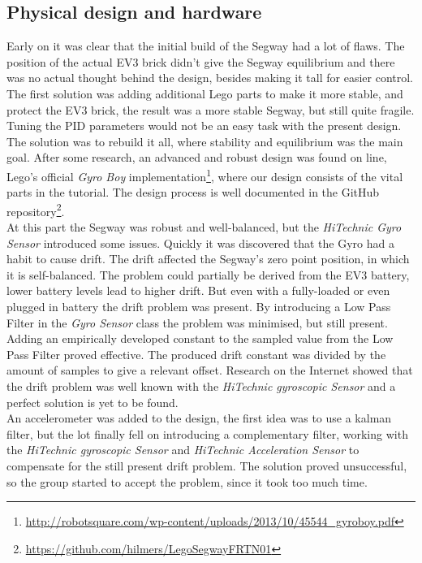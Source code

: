 \subsection{Physical design and hardware}
Early on it was clear that the initial build of the Segway had a lot of flaws. The position of the actual EV3 brick didn't give the Segway equilibrium and there was no actual thought behind the design, besides making it tall for easier control. The first solution was adding additional Lego parts to make it more stable, and protect the EV3 brick, the result was a more stable Segway, but still quite fragile.
Tuning the PID parameters would not be an easy task with the present design. The solution was to rebuild it all, where stability and equilibrium was the main goal. After some research, an advanced and robust design was found on line, Lego's official {\it Gyro Boy} implementation\footnote{\url{http://robotsquare.com/wp-content/uploads/2013/10/45544_gyroboy.pdf}}, where our design consists of the vital parts in the tutorial. The design process is well documented in the GitHub repository\footnote{\url{https://github.com/hilmers/LegoSegwayFRTN01}}. 
\\[3ex]
At this part the Segway was robust and well-balanced, but the {\it HiTechnic Gyro Sensor} introduced some issues. Quickly it was discovered that the Gyro had a habit to cause drift. The drift affected the Segway's zero point position, in which it is self-balanced. The problem could partially be derived from the EV3 battery, lower battery levels lead to higher drift. But even with a fully-loaded or even plugged in battery the drift problem was present. By introducing a Low Pass Filter in the {\it Gyro Sensor} class the problem was minimised, but still present. Adding an empirically developed constant to the sampled value from the Low Pass Filter proved effective. The produced drift constant was divided by the amount of samples to give a relevant offset. 
Research on the Internet showed that the drift problem was well known with the {\it HiTechnic gyroscopic Sensor} and a perfect solution is yet to be found. 
\\[3ex]
An accelerometer was added to the design, the first idea was to use a kalman filter, but the lot finally fell on introducing a complementary filter, working with the {\it HiTechnic gyroscopic Sensor} and {\it HiTechnic Acceleration Sensor} to compensate for the still present drift problem. The solution proved unsuccessful, so the group started to accept the problem, since it took too much time.        

